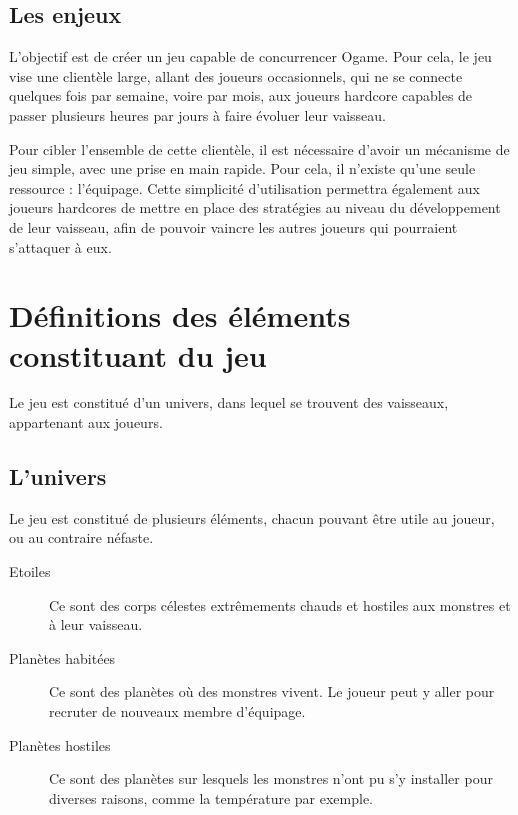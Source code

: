 \documentclass[a4paper,11pt]{report}
\begin{document}
    \section{Les enjeux}
    
    L'objectif est de créer un jeu capable de concurrencer Ogame.
    Pour cela, le jeu vise une clientèle large, allant des joueurs occasionnels, qui ne se connecte quelques fois par semaine, voire par mois, aux joueurs hardcore capables de passer plusieurs heures par jours à faire évoluer leur vaisseau.
    
    Pour cibler l'ensemble de cette clientèle, il est nécessaire d'avoir un mécanisme de jeu simple, avec une prise en main rapide. Pour cela, il n'existe qu'une seule ressource : l'équipage.
    Cette simplicité d'utilisation permettra également aux joueurs hardcores de mettre en place des stratégies au niveau du développement de leur vaisseau, afin de pouvoir vaincre les autres joueurs qui pourraient s'attaquer à eux.


\chapter{Définitions des éléments constituant du jeu}
Le jeu est constitué d'un univers, dans lequel se trouvent des vaisseaux, appartenant aux joueurs.
    \section{L'univers}
    Le jeu est constitué de plusieurs éléments, chacun pouvant être utile au joueur, ou au contraire néfaste.
      \begin{description}
        \item[Etoiles] Ce sont des corps célestes extrêmements chauds et hostiles aux monstres et à leur vaisseau.
        \item[Planètes habitées] Ce sont des planètes où des monstres vivent. Le joueur peut y aller pour recruter de nouveaux membre d'équipage.
        \item[Planètes hostiles] Ce sont des planètes sur lesquels les monstres n'ont pu s'y installer pour diverses raisons, comme la température par exemple.
      \end{description}
      
\end{document}
